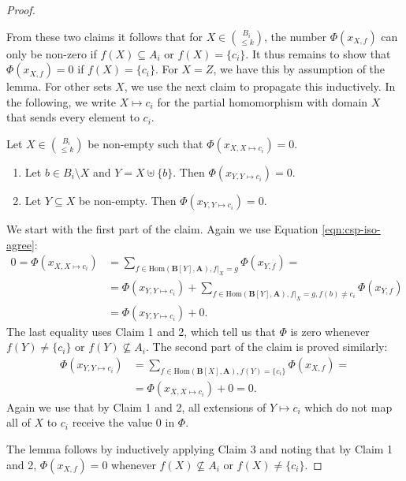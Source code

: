 \documentclass[a4paper,english, thm-restate]{lipics-v2021}
\newcommand{\StructA}{\mathbf{A}}
\newcommand{\StructB}{\mathbf{B}}
\newcommand{\Hom}[2]{\mathrm{Hom}(#1,#2)}
\begin{document}
\begin{proof}
\begin{claimproof}
		\end{claimproof}
		From these two claims it follows that for $X \in \binom{B_i}{\leq k}$, the number $\Phi(x_{X,f})$ can only be non-zero if $f(X) \subseteq A_i$ or $f(X) = \{c_i\}$.
		It thus remains to show that $\Phi(x_{X,f}) = 0$ if $f(X) = \{c_i\}$. For $X = Z$, we have this by assumption of the lemma. For other sets $X$, we use the next claim to propagate this inductively. In the following, we write $X \mapsto c_i$ for the partial homomorphism with domain $X$ that sends every element to $c_i$.
		\begin{claim}
			\label{clm:fixingIntegerSolutionInOr-C}
			Let $X \in \binom{B_i}{\leq k}$ be non-empty such that $\Phi(x_{X,X \mapsto c_i}) = 0$.
			\begin{enumerate}
				\item Let $b \in B_i \setminus X$ and $Y = X \uplus \{b\}$. Then $\Phi(x_{Y,Y \mapsto c_i}) = 0$.
				\item Let $Y \subseteq X$ be non-empty. Then $\Phi(x_{Y,Y\mapsto c_i}) = 0$.
			\end{enumerate}
		\end{claim}
		\begin{claimproof}
			We start with the first part of the claim. Again we use Equation \ref{eqn:csp-iso-agree}:
			\begin{align*}
				0 = \Phi(x_{X,X \mapsto c_i}) &= \sum_{f \in \Hom{\StructB[Y]}{\StructA}, f|_X = g} \Phi(x_{Y,f}) = \\
				&= \Phi(x_{Y, Y \mapsto c_i}) + \sum_{f \in \Hom{\StructB[Y]}{\StructA}, f|_X = g, f(b) \neq c_i} \Phi(x_{Y,f})\\
				&=  \Phi(x_{Y, Y \mapsto c_i}) + 0.
			\end{align*}
			The last equality uses Claim 1 and 2, which tell us that $\Phi$ is zero whenever $f(Y) \neq \{c_i\}$ or $f(Y) \not\subseteq A_i$.  
			The second part of the claim is proved similarly:
			\begin{align*}
				\Phi(x_{Y,Y \mapsto c_i}) &= \sum_{f \in \Hom{\StructB[X]}{\StructA}, f(Y) = \{c_i\}} \Phi(x_{X,f}) = \\
				&= \Phi(x_{X, X \mapsto c_i}) + 0 = 0.
			\end{align*}
			Again we use that by Claim 1 and 2, all extensions of $Y \mapsto c_i$ which do not map all of $X$ to $c_i$ receive the value $0$ in $\Phi$.
		\end{claimproof}
		The lemma follows by inductively applying Claim 3 and noting that by Claim 1 and 2, $\Phi(x_{X,f}) = 0$ whenever $f(X) \not\subseteq A_i$ or $f(X) \neq \{c_i\}$.
	\end{proof}
	
\end{document}

